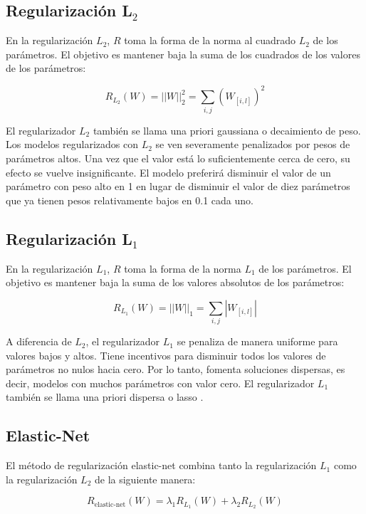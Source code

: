 \subsection{Regularización L$_2$}
En la regularización $L_2$, $R$ toma la forma de la norma al cuadrado $L_2$ de los parámetros. El objetivo es mantener baja la suma de los cuadrados de los valores de los parámetros:

\begin{displaymath}
R_{L_{2}}(W) = ||W||^{2}_{2} = \sum_{i,j}(W_{[i,l]})^2
\end{displaymath}

El regularizador $L_2$ también se llama una priori gaussiana o decaimiento de peso. Los modelos regularizados con $L_2$ se ven severamente penalizados por pesos de parámetros altos. Una vez que el valor está lo suficientemente cerca de cero, su efecto se vuelve insignificante. El modelo preferirá disminuir el valor de un parámetro con peso alto en 1 en lugar de disminuir el valor de diez parámetros que ya tienen pesos relativamente bajos en 0.1 cada uno.

\subsection{Regularización L$_1$}
En la regularización $L_1$, $R$ toma la forma de la norma $L_1$ de los parámetros. El objetivo es mantener baja la suma de los valores absolutos de los parámetros:

\begin{displaymath}
R_{L_{1}}(W) = ||W||_{1} = \sum_{i,j} |W_{[i,l]}|
\end{displaymath}

A diferencia de $L_2$, el regularizador $L_1$ se penaliza de manera uniforme para valores bajos y altos. Tiene incentivos para disminuir todos los valores de parámetros no nulos hacia cero. Por lo tanto, fomenta soluciones dispersas, es decir, modelos con muchos parámetros con valor cero. El regularizador $L_1$ también se llama una priori dispersa o lasso \cite{tibshirani1996regression}.

\subsection{Elastic-Net}
El método de regularización elastic-net \cite{zou2005regularization} combina tanto la regularización $L_1$ como la regularización $L_2$ de la siguiente manera:

\begin{displaymath}
R_{\text{elastic-net}}(W) = \lambda_1 R_{L_1}(W) + \lambda_2 R_{L_2}(W)
\end{displaymath}


